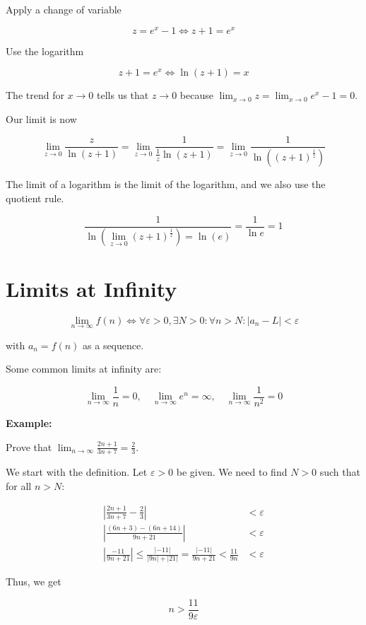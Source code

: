 Apply a change of variable 

\[
    z = e^x - 1 \iff z + 1 = e^x
\]

Use the logarithm 

\[
    z + 1 = e^x \iff \ln(z + 1) = x
\]

The trend for \(x \to 0 \) tells us that \(z \to 0\) because \(\lim_{x \to 0} z = \lim_{x \to 0} e^x - 1 = 0\).

Our limit is now 

\[
    \lim_{z \to 0} \frac{z}{\ln(z + 1)} = \lim_{z \to 0} \frac{1}{\frac{1}{z}\ln(z + 1)} = \lim_{z \to 0} \frac{1}{ \ln\left((z + 1)^{\frac{1}{z}}\right)}
\]

The limit of a logarithm is the limit of the logarithm, and we also use the quotient rule.

\[
    \frac{1}{ \ln\left(\lim_{z \to 0}(z + 1)^{\frac{1}{z}}\right) = \ln(e)} = \frac{1}{\ln e} = 1
\]

\section{Limits at Infinity}

\[
    \lim_{n \to \infty} f(n) \iff \forall \varepsilon > 0, \exists N > 0 : \forall n > N: |a_n - L| < \varepsilon 
\]

with \(a_n = f(n)\) as a sequence.

Some common limits at infinity are:

\[
    \lim_{n \to \infty} \frac{1}{n} = 0, \quad \lim_{n \to \infty} e^n = \infty, \quad \lim_{n \to \infty} \frac{1}{n^2} = 0
\]

\textbf{Example:}

Prove that \(\lim_{n \to \infty} \frac{2n + 1}{3n + 7} = \frac{2}{3}\).

We start with the definition. Let \(\varepsilon > 0\) be given. We need to find \(N > 0\) such that for all \(n > N\): 

\begin{align*}
    \left| \frac{2n + 1}{3n + 7} - \frac{2}{3} \right| &< \varepsilon \\ 
    \left| \frac{(6n + 3) - (6n + 14)}{9n + 21} \right| &< \varepsilon \\ 
    \left| \frac{-11}{9n + 21} \right| \le  \frac{|-11|}{|9n| + |21|} =  \frac{|-11|}{9n + 21} < \frac{11}{9n} &< \varepsilon
\end{align*}

Thus, we get 

\[
    n > \frac{11}{9 \varepsilon}
\]

